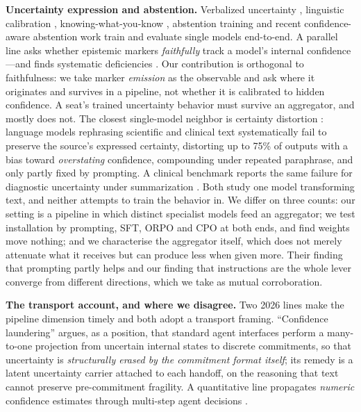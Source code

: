 \documentclass[11pt]{article}
\begin{document}
\textbf{Uncertainty expression and abstention.} Verbalized uncertainty \cite{lin2022}, linguistic calibration \cite{mielke2022}, knowing-what-you-know \cite{kadavath2022}, abstention training \cite{rtuning} and recent confidence-aware abstention work \cite{icalm,bas} train and evaluate single models end-to-end. A parallel line asks whether epistemic markers \emph{faithfully} track a model's internal confidence---and finds systematic deficiencies \cite{markerfaith,rhetmiscal,markerrel}. Our contribution is orthogonal to faithfulness: we take marker \emph{emission} as the observable and ask where it originates and survives in a pipeline, not whether it is calibrated to hidden confidence. A seat's trained uncertainty behavior must survive an aggregator, and mostly does not. The closest single-model neighbor is certainty distortion \cite{certdist}:
language models rephrasing scientific and clinical text systematically fail to
preserve the source's expressed certainty, distorting up to 75\% of outputs
with a bias toward \emph{overstating} confidence, compounding under repeated
paraphrase, and only partly fixed by prompting. A clinical benchmark reports
the same failure for diagnostic uncertainty under summarization
\cite{possdef}. Both study one model transforming text, and neither attempts
to train the behavior in. We differ on three counts: our setting is a pipeline
in which distinct specialist models feed an aggregator; we test installation
by prompting, SFT, ORPO and CPO at both ends, and find weights move nothing;
and we characterise the aggregator itself, which does not merely attenuate
what it receives but can produce less when given more. Their finding that
prompting partly helps and our finding that instructions are the whole lever
converge from different directions, which we take as mutual corroboration.

\textbf{The transport account, and where we disagree.} Two 2026 lines make the
pipeline dimension timely and both adopt a transport framing. ``Confidence
laundering'' \cite{laundering} argues, as a position, that standard agent
interfaces perform a many-to-one projection from uncertain internal states to
discrete commitments, so that uncertainty is \emph{structurally erased by the
commitment format itself}; its remedy is a latent uncertainty carrier attached
to each handoff, on the reasoning that text cannot preserve pre-commitment
fragility. A quantitative line propagates \emph{numeric} confidence estimates
through multi-step agent decisions \cite{uprop}.
\end{document}
